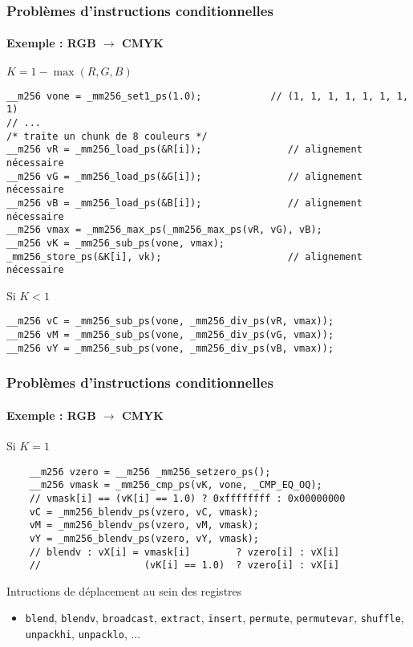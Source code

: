 \documentclass[xcolor={x11names,svgnames}]{beamer}
\begin{document}

\begin{frame}[fragile=singleslide]
  \frametitle{Problèmes d'instructions conditionnelles}
  \framesubtitle{Exemple : RGB $\rightarrow$ CMYK}

  \begin{block}{$K = 1 - \max(R, G, B)$}
\begin{verbatim}
__m256 vone = _mm256_set1_ps(1.0);            // (1, 1, 1, 1, 1, 1, 1, 1)
// ...
/* traite un chunk de 8 couleurs */
__m256 vR = _mm256_load_ps(&R[i]);               // alignement nécessaire
__m256 vG = _mm256_load_ps(&G[i]);               // alignement nécessaire
__m256 vB = _mm256_load_ps(&B[i]);               // alignement nécessaire
__m256 vmax = _mm256_max_ps(_mm256_max_ps(vR, vG), vB);
__m256 vK = _mm256_sub_ps(vone, vmax);
_mm256_store_ps(&K[i], vk);                      // alignement nécessaire
\end{verbatim}
\end{block}

  \begin{alertblock}{Si $K < 1$}
\begin{verbatim}
__m256 vC = _mm256_sub_ps(vone, _mm256_div_ps(vR, vmax));
__m256 vM = _mm256_sub_ps(vone, _mm256_div_ps(vG, vmax));
__m256 vY = _mm256_sub_ps(vone, _mm256_div_ps(vB, vmax));
\end{verbatim}
  \end{alertblock}  
\end{frame}


\begin{frame}[fragile=singleslide]
  \frametitle{Problèmes d'instructions conditionnelles}
  \framesubtitle{Exemple : RGB $\rightarrow$ CMYK}

  \begin{exampleblock}{Si $K = 1$}
\begin{verbatim}
    __m256 vzero = __m256 _mm256_setzero_ps();
    __m256 vmask = _mm256_cmp_ps(vK, vone, _CMP_EQ_OQ);
    // vmask[i] == (vK[i] == 1.0) ? 0xffffffff : 0x00000000 
    vC = _mm256_blendv_ps(vzero, vC, vmask);
    vM = _mm256_blendv_ps(vzero, vM, vmask);
    vY = _mm256_blendv_ps(vzero, vY, vmask);
    // blendv : vX[i] = vmask[i]        ? vzero[i] : vX[i]
    //                  (vK[i] == 1.0)  ? vzero[i] : vX[i]   
\end{verbatim}
  \end{exampleblock}

  \begin{block}{Intructions de déplacement au sein des registres}
  \begin{itemize}
  \item \texttt{blend}, \texttt{blendv}, \texttt{broadcast}, \texttt{extract}, \texttt{insert}, \texttt{permute},  \texttt{permutevar}, \texttt{shuffle}, \texttt{unpackhi}, \texttt{unpacklo}, ...
  \end{itemize}
\end{block}
\end{frame}
\end{document}

